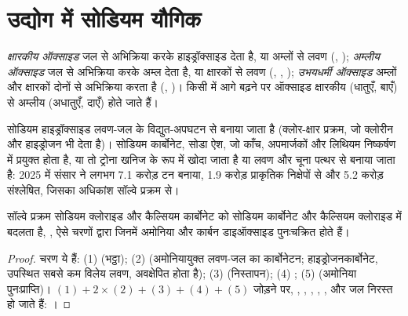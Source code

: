 \section{उद्योग में सोडियम यौगिक}

\begin{definition}[ऑक्साइडों का स्वभाव]\label{def:b1:s-block:oxide-character}
\emph{क्षारकीय ऑक्साइड} जल से अभिक्रिया करके
हाइड्रॉक्साइड देता है, या अम्लों से लवण (, ); \emph{अम्लीय
ऑक्साइड} जल से अभिक्रिया करके अम्ल देता है,
या क्षारकों से लवण (, , ); \emph{उभयधर्मी
ऑक्साइड} अम्लों और क्षारकों दोनों से अभिक्रिया करता है
(, )। किसी  में आगे बढ़ने पर ऑक्साइड क्षारकीय
(धातुएँ, बाएँ) से अम्लीय (अधातुएँ, दाएँ) होते जाते हैं।
\end{definition}

सोडियम हाइड्रॉक्साइड लवण-जल के विद्युत-अपघटन से बनाया जाता है (क्लोर-क्षार
प्रक्रम, जो क्लोरीन और हाइड्रोजन भी देता है)। सोडियम कार्बोनेट, सोडा
ऐश, जो काँच, अपमार्जकों और लिथियम निष्कर्षण में प्रयुक्त होता है, या तो
ट्रोना खनिज के रूप में खोदा जाता है या लवण और चूना पत्थर से बनाया जाता है: 2025 में संसार ने
लगभग 7.1 करोड़ टन बनाया, 1.9 करोड़ प्राकृतिक निक्षेपों से और 5.2
करोड़ संश्लेषित, जिसका अधिकांश सॉल्वे प्रक्रम से।

\begin{proposition}[सॉल्वे प्रक्रम]\label{prop:b1:s-block:solvay}
सॉल्वे प्रक्रम सोडियम क्लोराइड और कैल्सियम कार्बोनेट को
सोडियम कार्बोनेट और कैल्सियम क्लोराइड में बदलता है, , ऐसे चरणों द्वारा जिनमें अमोनिया और कार्बन डाइऑक्साइड पुनःचक्रित होते हैं।
\end{proposition}

\begin{proof}
चरण ये हैं: (1)  (भट्ठा); (2)  (अमोनियायुक्त लवण-जल का कार्बोनेटन;
हाइड्रोजनकार्बोनेट, उपस्थित सबसे कम विलेय लवण, अवक्षेपित होता है); (3)
 (निस्तापन); (4) ; (5)  (अमोनिया
पुनःप्राप्ति)। $(1) + 2\times(2) + (3) + (4) + (5)$ जोड़ने पर, ,
, , , ,  और जल निरस्त हो जाते हैं:
।
\end{proof}

